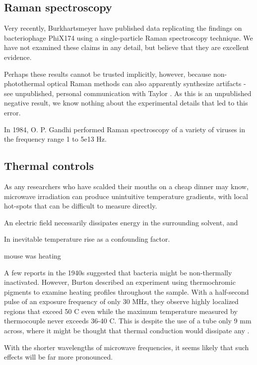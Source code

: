 \documentclass[paper.tex]{subfiles}
\begin{document}
\begin{multicols}{1}
\subsection{Raman spectroscopy}

Very recently, Burkhartsmeyer \cite{Optical2020} have published data replicating the findings on bacteriophage PhiX174 using a single-particle Raman spectroscopy technique. We have not examined these claims in any detail, but believe that they are excellent evidence.

Perhaps these results cannot be trusted implicitly, however, because non-photothermal optical Raman methods can also apparently synthesize artifacts - see unpublished, personal communication with Taylor \cite{mechanisms1981}. As this is an unpublished negative result, we know nothing about the experimental details that led to this error.

In 1984, O. P. Gandhi \cite{BIOLOGICALa} performed Raman spectroscopy of a variety of viruses in the frequency range 1 to 5e13 Hz.


\subsection{Thermal controls}

As any researchers who have scalded their mouths on a cheap dinner may know, microwave irradiation can produce unintuitive temperature gradients, with local hot-spots that can be difficult to measure directly.

An electric field necessarily dissipates energy in the surrounding solvent, and 

In inevitable temperature rise as a confounding factor. 

mouse was heating

A few reports in the 1940s suggested that bacteria might be non-thermally inactivated. However, Burton\cite{Effects1950} described an experiment using thermochromic pigments to examine heating profiles throughout the sample. With a half-second pulse of an exposure frequency of only 30 MHz, they observe highly localized regions that exceed 50 C even while the maximum temperature measured by thermocouple never exceeds 36-40 C. This is despite the use of a tube only 9 mm across, where it might be thought that thermal conduction would dissipate any . 

With the shorter wavelengths of microwave frequencies, it seems likely that such effects will be far more pronounced.


\end{multicols}
\end{document}
